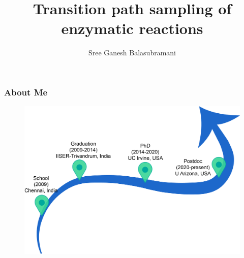 \documentclass{beamer}
\title[TPS free energies]{Transition path sampling of enzymatic reactions}
\author[Schwartz Group]{Sree Ganesh Balasubramani}
\institute[U of A]{Schwartz Group \\ Chemistry and Biochemistry } %
\date{}
\begin{document}
\begin{frame}
  \titlepage
\end{frame}
\begin{frame}
\frametitle{About Me}
\begin{figure}
\includegraphics[scale=0.6]{figures/sree_aboutme.png}
\end{figure}

\end{frame}
\end{document}
